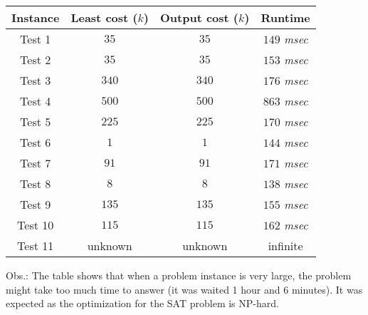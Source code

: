 \documentclass[conference]{IEEEtran}
\begin{document}
\begin{tabular}{ c | c | c | c}
 \hline
  Instance & Least cost ($k$) & Output cost ($k$) & Runtime
  \\ \hline
      Test 1 & $35$ & $35$ & $149$ \textit{msec}\\ \hline 
      Test 2 & $35$ & $35$  &  $153$ \textit{msec}  \\ \hline
      Test 3 & $340$& $340$ &  $176$ \textit{msec} \\ \hline
      Test 4 & $500$ & $500$ &  $863$ \textit{msec} \\ \hline
      Test 5 & $225$ & $225$ &  $170$ \textit{msec} \\ \hline
      Test 6 & $1$ & $1$  &  $144$ \textit{msec} \\ \hline
      Test 7 & $91$ & $91$  &  $171$ \textit{msec} \\ \hline
      Test 8 & $8$ & $8$  &  $138$ \textit{msec} \\ \hline
      Test 9 & $135$ & $135$  &  $155$ \textit{msec} \\ \hline
      Test 10 & $115$ & $115$  &  $162$ \textit{msec} \\ \hline
      Test 11 & unknown & unknown  &  infinite \\ \hline
  \end{tabular}
Obs.: The table shows that when a problem instance is very large, the problem might take too much time to answer (it was waited 1 hour and 6 minutes). It was expected as the optimization for the SAT problem is NP-hard.
\end{document}
